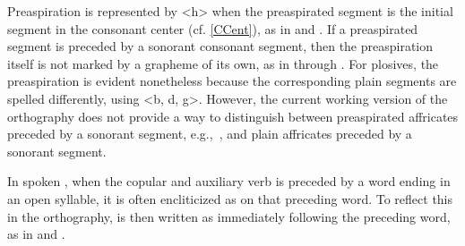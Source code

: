Preaspiration is represented by <h> when the preaspirated segment is the initial segment in the consonant center (cf. \SEC\ref{CCent}), as in  and . 
\ea\label{spellEx6}
\z
\ea\label{spellEx7}
\z
If a preaspirated segment is preceded by a sonorant consonant segment, then the preaspiration itself is not marked by a grapheme of its own, as in  through .
\ea\label{spellEx8}
\z
\ea\label{spellEx9}
\z
\ea\label{spellEx10}
\z
For plosives, the preaspiration is evident nonetheless because the corresponding plain segments are spelled differently, using <b, d, g>. However, the current working version of the orthography does not provide a way to distinguish between preaspirated affricates preceded by a sonorant segment, e.g.,~, and plain affricates preceded by a sonorant segment. 

In spoken \PS, when the copular and auxiliary verb  is preceded by a word ending in an open syllable, it is often encliticized as  on that preceding word. To reflect this in the orthography,  is then written as  immediately following the preceding word, as in  and . 
\ea\label{IScliticEx1}
\z
\ea\label{IScliticEx2}
\z


